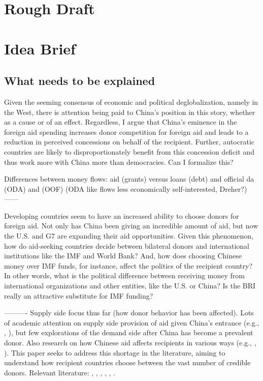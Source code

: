\section*{Rough Draft}

\section*{Idea Brief}
\subsection*{What needs to be explained}
Given the seeming consensus of economic and political deglobalization,  namely in the West, there is attention being paid to China's position in this story, whether as a cause or of an effect. Regardless, I argue that China's eminence in the foreign aid spending increases donor competition for foreign aid and leads to a reduction in perceived concessions on behalf of the recipient. Further, autocratic countries are likely to disproportionately benefit from this concession deficit and thus work more with China more than democracies. Can I formalize this?

Differences between money flows: aid (grants) versus loans (debt) and official da (ODA) and (OOF) (ODA like flows less economically self-interested, Dreher?)
------

Developing countries seem to have an increased ability to choose donors for foreign aid. Not only has China been giving an incredible amount of aid, but now the U.S. and G7 are expanding their aid opportunities. Given this phenomenon, how do aid-seeking countries decide between bilateral donors and international institutions like the IMF and World Bank? And, how does choosing Chinese money over IMF funds, for instance, affect the politics of the recipient country? In other words, what is the political difference between receiving money from international organizations and other entities, like the U.S. or China? Is the BRI really an attractive substitute for IMF funding?

----------
Supply side focus thus far (how donor behavior has been affected).
Lots of academic attention on supply side provision of aid given China's entrance (e.g., , \cite{dreher2015}), but few explorations of the demand side after China has become a prevalent donor. Also research on how Chinese aid affects recipients in various ways (e.g., \cite{martorano2020}, \cite{bader2015}).
This paper seeks to address this shortage in the literature, aiming to understand how recipient countries choose between the vast number of credible donors. Relevant literature: \cite{kilama2016a}, \cite{hernandez2017}, \cite{li2017a}, \cite{isaksson2018}, \cite{humphrey2019}, \cite{broich2017a}.

